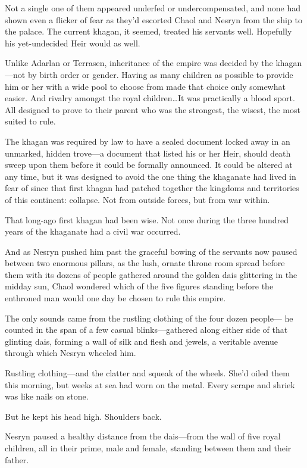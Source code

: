 Not a single one of them appeared underfed or undercompensated, and none had shown even a flicker of fear as they'd escorted Chaol and Nesryn from the ship to the palace.
The current khagan, it seemed, treated his servants well.
Hopefully his yet-undecided Heir would as well.

Unlike Adarlan or Terrasen, inheritance of the empire was decided by the khagan---not by birth order or gender.
Having as many children as possible to provide him or her with a wide pool to choose from made that choice only somewhat easier.
And rivalry amongst the royal children\ldots It was practically a blood sport.
All designed to prove to their parent who was the strongest, the wisest, the most suited to rule.

The khagan was required by law to have a sealed document locked away in an unmarked, hidden trove---a document that listed his or her Heir, should death sweep upon them before it could be formally announced.
It could be altered at any time, but it was designed to avoid the one thing the khaganate had lived in fear of since that first khagan had patched together the kingdoms and territories of this continent: collapse.
Not from outside forces, but from war within.

That long-ago first khagan had been wise.
Not once during the three hundred years of the khaganate had a civil war occurred.

And as Nesryn pushed him past the graceful bowing of the servants now paused between two enormous pillars, as the lush, ornate throne room spread before them with its dozens of people gathered around the golden dais glittering in the midday sun, Chaol wondered which of the five figures standing before the enthroned man would one day be chosen to rule this empire.

The only sounds came from the rustling clothing of the four dozen people--- he counted in the span of a few casual blinks---gathered along either side of that glinting dais, forming a wall of silk and flesh and jewels, a veritable avenue through which Nesryn wheeled him.

Rustling clothing---and the clatter and squeak of the wheels.
She'd oiled them this morning, but weeks at sea had worn on the metal.
Every scrape and shriek was like nails on stone.

But he kept his head high.
Shoulders back.

Nesryn paused a healthy distance from the dais---from the wall of five royal children, all in their prime, male and female, standing between them and their father.

